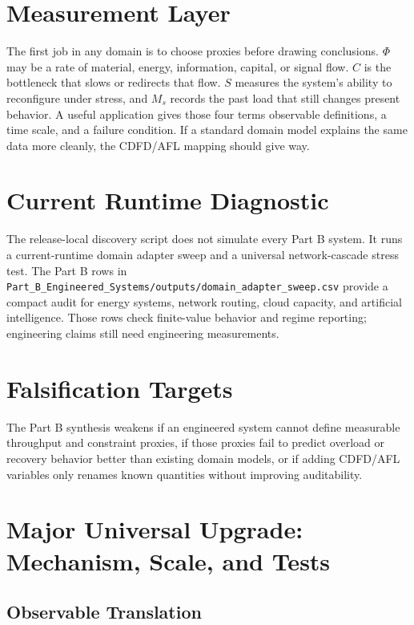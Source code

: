 \documentclass[12pt,a4paper]{article}
\begin{document}
\section{Measurement Layer}

The first job in any domain is to choose proxies before drawing conclusions. $\Phi$ may be a rate of material, energy, information, capital, or signal flow. $C$ is the bottleneck that slows or redirects that flow. $S$ measures the system's ability to reconfigure under stress, and $M_s$ records the past load that still changes present behavior. A useful application gives those four terms observable definitions, a time scale, and a failure condition. If a standard domain model explains the same data more cleanly, the CDFD/AFL mapping should give way.

\section{Current Runtime Diagnostic}

The release-local discovery script
does not simulate every Part B system. It runs a current-runtime domain adapter
sweep and a universal network-cascade stress test. The Part B rows in
\texttt{Part\_B\_Engineered\_Systems/outputs/domain\_adapter\_sweep.csv} provide a compact audit for
energy systems, network routing, cloud capacity, and artificial intelligence.
Those rows check finite-value behavior and regime reporting; engineering claims
still need engineering measurements.

\section{Falsification Targets}

The Part B synthesis weakens if an engineered system cannot define measurable
throughput and constraint proxies, if those proxies fail to predict overload or
recovery behavior better than existing domain models, or if adding CDFD/AFL
variables only renames known quantities without improving auditability.

\section{Major Universal Upgrade: Mechanism, Scale, and Tests}

\subsection{Observable Translation}
\end{document}
